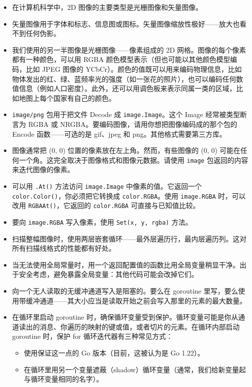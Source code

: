 \begin{itemize}
\item 在计算机科学中，2D 图像的主要类型是光栅图像和矢量图像。
\item 矢量图像用于字体和标志、信息图或图标。矢量图像缩放性极好——放大也看不到任何伪影。
\item 我们使用的另一半图像是光栅图像——像素组成的 2D 网格。图像的每个像素都有一种颜色，可以用 RGBA 颜色模型表示（但也可能以其他颜色模型编码，比如 JPEG 图像的 YCbCr）。颜色的值既可以用来编码物理信息，比如物体发出的红、绿、蓝频率光的强度（如一张花的照片），也可以编码任何数值信息（例如人口密度）。此外，还可以用调色板来表示同属一类的区域，比如地图上每个国家有自己的颜色。
\item \texttt{image/png} 包用于把文件 Decode 成 \texttt{image.Image}。这个 Image 经常被类型断言为 RGBA 或 NRGBA。要编码图像，请用你想把图像编码成的那个包的 Encode 函数——可选的是 gif、jpeg 和 png。其他格式需要第三方库。
\item 图像通常把 (0, 0) 位置的像素放在左上角。然而，有些图像的 (0, 0) 可能在任何一个角。这完全取决于图像格式和图像元数据。请使用 \texttt{image} 包返回的内容来迭代图像的像素。
\item 可以用 \texttt{.At()} 方法访问 \texttt{image.Image} 中像素的值。它返回一个 \texttt{color.Color()}，你必须把它转换成 \texttt{color.RGBA}。使用 \texttt{image.RGBA} 时，可以改用 \texttt{RGBAAt()}，它返回的 \texttt{color.RGBA} 可直接与已知值比较。
\item 要向 \texttt{image.RGBA} 写入像素，使用 \texttt{Set(x, y, rgba)} 方法。
\item 扫描整幅图像时，使用两层嵌套循环——最外层遍历行，最内层遍历列。这对所有扫描线格式的性能都有好处。
\item 当无法使用全局常量时，用一个返回配置值的函数比用全局变量稍显干净。出于安全考虑，避免暴露全局变量：其他代码可能会改掉它们。
\item 向一个无人读取的无缓冲通道写入是阻塞的。要么在 goroutine 里写，要么使用带缓冲通道——其大小应当是读取开始之前会写入那里的元素的最大数量。
\item 在循环里启动 goroutine 时，确保循环变量受到保护。循环变量可能是你从通道读出的消息、你遍历的映射的键或值，或者切片的元素。在循环内部启动 goroutine 时，保护 for 循环迭代器有三种常见方式：
  \begin{itemize}
  \item 使用保证这一点的 Go 版本（目前，这被认为是 Go 1.22）。
  \item 在循环里用另一个变量遮蔽（shadow）循环变量（通常，我们给新变量起与循环变量相同的名字）。

\end{itemize}
\end{itemize}

